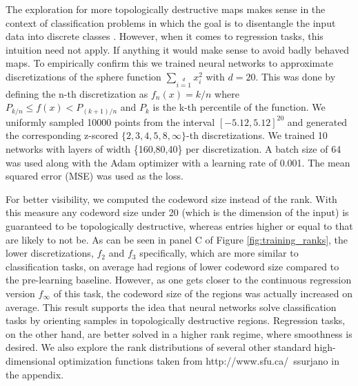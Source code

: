 The exploration for more topologically destructive maps makes sense in the context of classification problems in which the goal is to disentangle the input data into discrete classes \cite{naitzat2020topology}. However, when it comes to regression tasks, this intuition need not apply. If anything it would make sense to avoid badly behaved maps. To empirically confirm this we trained neural networks to approximate discretizations of the sphere function $\sum\limits_{i=1}\limits^{d}x_i^2$ with $d=20$. This was done by defining the n-th discretization as $f_n(x) = k/n$ where $P_{k/n}\leq f(x) <P_{(k+1)/n}$ and $P_k$ is the k-th percentile of the function. We uniformly sampled 10000 points from the interval $[-5.12,5.12]^{20}$ and generated the corresponding z-scored $\{2,3,4,5,8,\infty\}$-th discretizations. We trained 10 networks with layers of width \{160,80,40\} per discretization. A batch size of 64 was used along with the Adam optimizer with a learning rate of 0.001. The mean squared error (MSE) was used as the loss.

For better visibility, we computed the codeword size instead of the rank. With this measure any codeword size under 20 (which is the dimension of the input) is guaranteed to be topologically destructive, whereas entries higher or equal to that are likely to not be. As can be seen in panel C of Figure \ref{fig:training_ranks}, the lower discretizations, $f_2$ and $f_3$ specifically, which are more similar to classification tasks, on average had regions of lower codeword size compared to the pre-learning baseline. However, as one gets closer to the continuous regression version $f_\infty$ of this task, the codeword size of the regions was actually increased on average. This result supports the idea that neural networks solve classification tasks by orienting samples in topologically destructive regions. Regression tasks, on the other hand, are better solved in a higher rank regime, where smoothness is desired. We also explore the rank distributions of several other standard high-dimensional optimization functions taken from  http://www.sfu.ca/~ssurjano \cite{surj2013} in the appendix. 



